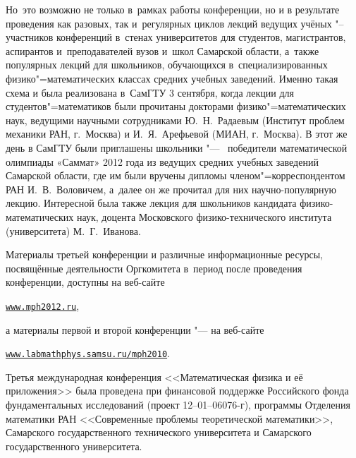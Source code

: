 Но~это возможно не только в~рамках работы конференции, но и в результате проведения как разовых, так и~регулярных циклов лекций ведущих учёных "--~ участников конференций в~стенах университетов для студентов, магистрантов, аспирантов и~преподавателей вузов и~школ Самарской области, а~также популярных лекций для школьников, обучающихся в~специализированных физико"=математических классах средних учебных заведений. Именно такая схема и была реализована в~СамГТУ 3 сентября, когда лекции для студентов"=математиков были прочитаны докторами физико"=математических наук, ведущими научными сотрудниками Ю.~Н.~Радаевым (Институт проблем механики РАН, г.~Москва) и И.~Я.~Арефьевой (МИАН, г.~Москва). В этот же день в СамГТУ были приглашены школьники "---~ победители математической олимпиады «Саммат» 2012 года из ведущих средних учебных заведений Самарской области, где им были вручены дипломы членом"=корреспондентом РАН И.~В.~Воловичем, а~далее он же прочитал для них научно-популярную лекцию. Интересной была также лекция для школьников кандидата физико-математических наук, доцента Московского физико-технического института (университета) М.~Г.~Иванова.





Материалы третьей конференции и различные информационные ресурсы, посвящённые деятельности Оргкомитета в~период после проведения конференции, доступны на веб-сайте





\centerline{\href{http://mph2012.ru}{\tt www.mph2012.ru},}

\smallskip



\noindent

а материалы первой и второй конференции "--- на веб-сайте



\centerline{\href{http://www.labmathphys.samsu.ru/mph2010}{\tt www.labmathphys.samsu.ru/mph2010}.}

\smallskip



Третья международная конференция <<Математическая физика и её приложения>> была проведена при финансовой поддержке Российского фонда фундаментальных исследований (проект 12--01--06076-г), программы Отделения математики РАН <<Современные проблемы теоретической математики>>, Самарского государственного технического университета и Самарского государственного университета.







